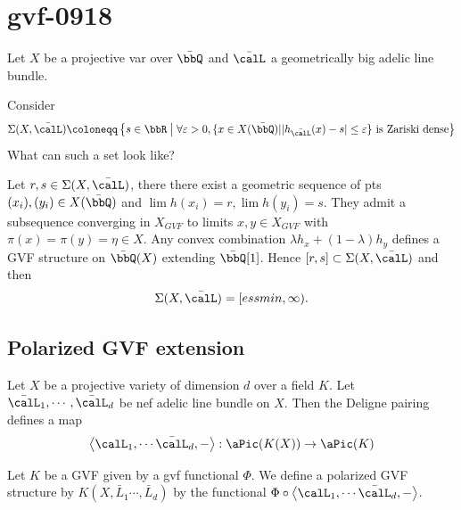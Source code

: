 \section{gvf-0918}

Let $X$ be a projective var over $\bar{\bbQ}$ and $\bar{\calL}$ a geometrically big adelic line bundle.

\begin{question}[label=\labelNFM{ques:1}, status=draft, tag=0000000]
	Consider
	\[ \Sigma(X,\bar{\calL}) \coloneqq \left\{ s \in \bbR \;\middle|\; \forall \varepsilon > 0, \{x \in X(\bar{\bbQ}) | |h_{\bar{\calL}}(x) - s| \leq \varepsilon\} \text{ is Zariski dense} \right\}  \]
	What can such a set look like?
\end{question}

Let $r,s \in \Sigma(X,\bar{\calL})$, there there exist a geometric sequence of pts $(x_i), (y_i) \in X(\bar{\bbQ})$ and $\lim h(x_i) = r, \lim h(y_i) = s$.
They admit a subsequence converging in $X_{GVF}$ to limits $x,y \in X_{GVF}$ with $\pi(x) = \pi(y) = \eta \in X$.
Any convex combination $\lambda h_x + (1-\lambda)h_y$ defines a GVF structure on $\bar{\bbQ}(X)$ extending $\bar{\bbQ}[1]$.
Hence $[r,s] \subset \Sigma(X,\bar{\calL})$ and then
\[ \Sigma(X,\bar{\calL}) = [essmin, \infty). \]

\subsection[status=draft,tag=0000000,label=\labelNFM{subsec:2}]{Polarized GVF extension}

Let $X$ be a projective variety of dimension $d$ over a field $K$.
Let $\bar{\calL}_1,\cdots,\bar{\calL}_d$ be nef adelic line bundle on $X$.
Then the Deligne pairing defines a map
\[ \left< \calL_1,\cdots \bar{\calL}_d,- \right>: \aPic(K(X)) \to \aPic(K) \]

\begin{definition}[label=\labelNFM{def:3}, status=draft, tag=0000000]
	Let $K$ be a GVF given by a gvf functional $\Phi$.
	We define a polarized GVF structure by $K(X,\bar{L}_1\cdots, \bar{L}_d)$ by the functional $\Phi \circ \left< \calL_1,\cdots \bar{\calL}_d,- \right>$.
\end{definition}














